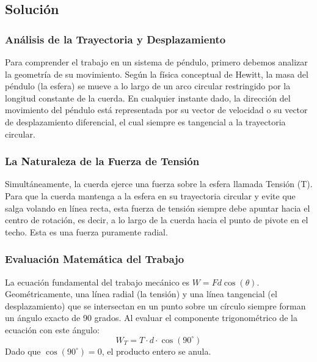 \documentclass[a4paper,12pt]{article}
\begin{document}
\begin{center}
\end{center}

\subsection*{Solución}

\subsubsection*{Análisis de la Trayectoria y Desplazamiento}
Para comprender el trabajo en un sistema de péndulo, primero debemos analizar la geometría de su movimiento. Según la física conceptual de Hewitt, la masa del péndulo (la esfera) se mueve a lo largo de un arco circular restringido por la longitud constante de la cuerda. En cualquier instante dado, la dirección del movimiento del péndulo está representada por su vector de velocidad o su vector de desplazamiento diferencial, el cual siempre es tangencial a la trayectoria circular.

\subsubsection*{La Naturaleza de la Fuerza de Tensión}
Simultáneamente, la cuerda ejerce una fuerza sobre la esfera llamada Tensión (T). Para que la cuerda mantenga a la esfera en su trayectoria circular y evite que salga volando en línea recta, esta fuerza de tensión siempre debe apuntar hacia el centro de rotación, es decir, a lo largo de la cuerda hacia el punto de pivote en el techo. Esta es una fuerza puramente radial.

\subsubsection*{Evaluación Matemática del Trabajo}
La ecuación fundamental del trabajo mecánico es $W = F d \cos(\theta)$. Geométricamente, una línea radial (la tensión) y una línea tangencial (el desplazamiento) que se intersectan en un punto sobre un círculo siempre forman un ángulo exacto de 90 grados. 
Al evaluar el componente trigonométrico de la ecuación con este ángulo:
$$W_T = T \cdot d \cdot \cos(90^\circ)$$
Dado que $\cos(90^\circ) = 0$, el producto entero se anula. 
\end{document}
